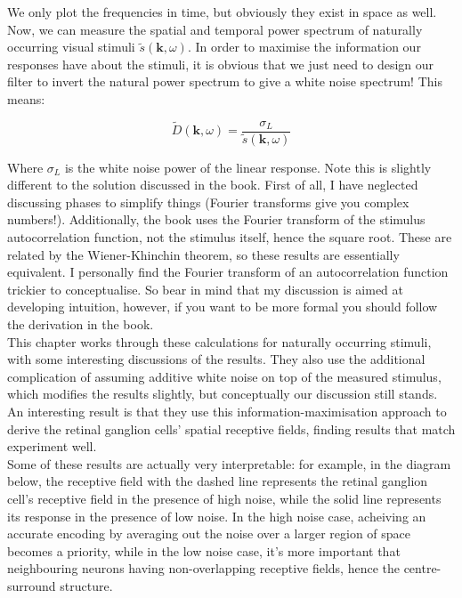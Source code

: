\documentclass{article}
\begin{document}
We only plot the frequencies in time, but obviously they exist in space as well. Now, we can measure the spatial and temporal power spectrum of naturally occurring visual stimuli $\tilde{s}(\bm{k},\omega)$. In order to maximise the information our responses have about the stimuli, it is obvious that we just need to design our filter to invert the natural power spectrum to give a white noise spectrum! This means:

\begin{equation*}
	\tilde{D}(\bm{k},\omega)=\frac{\sigma_L}{\tilde{s}(\bm{k},\omega)}
\end{equation*}

Where $\sigma_L$ is the white noise power of the linear response. Note this is slightly different to the solution discussed in the book. First of all, I have neglected discussing phases to simplify things (Fourier transforms give you complex numbers!). Additionally, the book uses the Fourier transform of the stimulus autocorrelation function, not the stimulus itself, hence the square root. These are related by the Wiener-Khinchin theorem, so these results are essentially equivalent. I personally find the Fourier transform of an autocorrelation function trickier to conceptualise. So bear in mind that my discussion is aimed at developing intuition, however, if you want to be more formal you should follow the derivation in the book.\\

This chapter works through these calculations for naturally occurring stimuli, with some interesting discussions of the results. They also use the additional complication of assuming additive white noise on top of the measured stimulus, which modifies the results slightly, but conceptually our discussion still stands. An interesting result is that they use this information-maximisation approach to derive the retinal ganglion cells' spatial receptive fields, finding results that match experiment well.\\

Some of these results are actually very interpretable: for example, in the diagram below, the receptive field with the dashed line represents the retinal ganglion cell's receptive field in the presence of high noise, while the solid line represents its response in the presence of low noise. In the high noise case, acheiving an accurate encoding by averaging out the noise over a larger region of space becomes a priority, while in the low noise case, it's more important that neighbouring neurons having non-overlapping receptive fields, hence the centre-surround structure.
\end{document}
